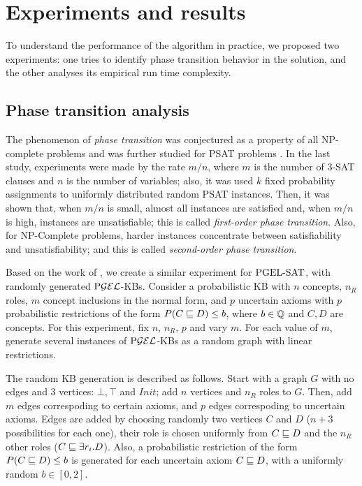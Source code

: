 
\chapter{Experiments and results}
\label{cap:experiments}

To understand the performance of the algorithm in practice, we proposed two experiments: one tries to identify phase transition behavior in the solution, and the other analyses its empirical run time complexity.

\section{Phase transition analysis}
\label{sec:phase-trans}

The phenomenon of \emph{phase transition} was conjectured as a property of all NP-complete problems \citep{cheeseman1991really} and was further studied for PSAT problems \citep{Finger2011ProbabilisticSL}. In the last study, experiments were made by the rate $m/n$, where $m$ is the number of 3-SAT clauses and $n$ is the number of variables; also, it was used $k$ fixed probability assignments to uniformly distributed random PSAT instances. Then, it was shown that, when $m/n$ is small, almost all instances are satisfied and, when $m/n$ is high, instances are unsatisfiable; this is called \emph{first-order phase transition}. Also, for NP-Complete problems, harder instances concentrate between satisfiability and unsatisfiability; and this is called \emph{second-order phase transition}.

Based on the work of \citeauthor{Finger2011ProbabilisticSL}, we create a similar experiment for $\text{PGEL-SAT}$, with randomly generated $\text{P}\mathcal{GEL}$-KBs. Consider a probabilistic KB with $n$ concepts, $n_R$ roles, $m$ concept inclusions in the normal form, and $p$ uncertain axioms with $p$ probabilistic restrictions of the form $P(C \sqsubseteq D) \leq b$, where $b \in \mathbb{Q}$ and $C, D$ are concepts. For this experiment, fix $n$, $n_R$, $p$ and vary $m$. For each value of $m$, generate several instances of $\text{P}\mathcal{GEL}$-KBs as a random graph with linear restrictions.

The random KB generation is described as follows. Start with a graph $G$ with no edges and 3 vertices: $\bot, \top$ and $Init$; add $n$ vertices and $n_R$ roles to $G$. Then, add $m$ edges correspoding to certain axioms, and $p$ edges correspoding to uncertain axioms. Edges are added by choosing randomly two vertices $C$ and $D$ ($n+3$ possibilities for each one), their role is chosen uniformly from $C \sqsubseteq D$ and the $n_R$ other roles ($C \sqsubseteq \exists r_i.D$). Also, a probabilistic restriction of the form $P(C \sqsubseteq D) \leq b$ is generated for each uncertain axiom $C \sqsubseteq D$, with a uniformly random $b \in [0, 2]$.


